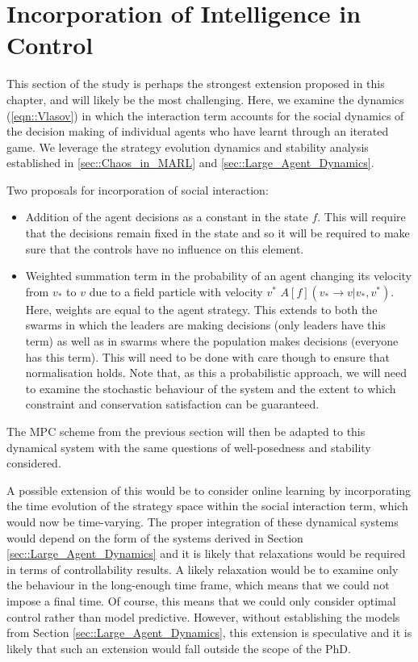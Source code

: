 \documentclass[.../main.tex]{subfiles}
\begin{document}
    \section{Incorporation of Intelligence in Control} \label{sec::Intelligence_in_control}

    This section of the study is perhaps the strongest extension
    proposed in this chapter, and will likely be the most
    challenging. Here, we examine the dynamics (\ref{eqn::Vlasov}) in
    which the interaction term accounts for the social dynamics of the
    decision making of individual agents who have learnt through an
    iterated game. We leverage the strategy evolution dynamics and
    stability analysis established in \ref{sec::Chaos_in_MARL} and
    \ref{sec::Large_Agent_Dynamics}.

	Two proposals for incorporation of social interaction:
	\begin{itemize}
		\item Addition of the agent decisions as a constant in the state $f$. This will require that
		the decisions remain fixed in the state and so it will be required to make sure that the
		controls have no influence on this element.
		\item Weighted summation term in the probability of an agent changing its velocity from
		$v_*$ to
		$v$ due to a field particle with velocity $v^*$ $A[f](v_* \rightarrow v | v_*, v^*)$.
		Here, weights are equal to the agent strategy. This extends to both the swarms in
		which the leaders are making decisions (only leaders have this term) as well as in
		swarms where the population makes decisions (everyone has this term). This will need to be
		done with care though to ensure that normalisation holds. Note that, as this a probabilistic
		approach, we will need to examine the stochastic behaviour of the system and the extent to
		which constraint and conservation satisfaction can be guaranteed.
	\end{itemize}

	The MPC scheme from the previous section will then be adapted to this dynamical system with the
	same questions of well-posedness and stability considered. 

	A possible extension of this would be to consider online learning by incorporating the time
	evolution of the strategy space within the social interaction term, which would now be
	time-varying. The proper integration of these dynamical systems would depend on the form of the
	systems derived in Section \ref{sec::Large_Agent_Dynamics} and it is likely that relaxations would
	be required in terms of controllability results. A likely relaxation would be to examine only the
	behaviour in the long-enough time frame, which means that we could not impose a final time. Of
	course, this means that we could only consider optimal control rather than model predictive.
	However, without establishing the models from Section \ref{sec::Large_Agent_Dynamics}, this
	extension is speculative and it is likely that such an extension would fall outside the scope of
	the PhD.

\end{document}

